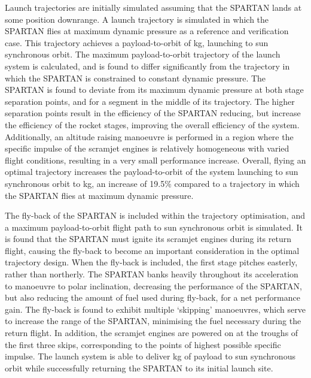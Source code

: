 Launch trajectories are initially simulated assuming that the SPARTAN lands at some position downrange. A launch trajectory is simulated in which the SPARTAN flies at maximum dynamic pressure as a reference and verification case. This trajectory achieves a payload-to-orbit of \PayloadToOrbitConstqNoReturn kg, launching to sun synchronous orbit.  
The maximum payload-to-orbit trajectory of the launch system is calculated, and is found to differ significantly from the trajectory in which the SPARTAN is constrained to constant dynamic pressure. 
 The SPARTAN is found to deviate from its maximum dynamic pressure at both stage separation points, and for a segment in the middle of its trajectory.
 The higher separation points result in the efficiency of the SPARTAN reducing, but increase the efficiency of the rocket stages, improving the overall efficiency of the system. 
  Additionally, an altitude raising manoeuvre is performed in a region where the specific impulse of the scramjet engines is relatively homogeneous with varied flight conditions, resulting in a very small performance increase. Overall, flying an optimal trajectory increases the payload-to-orbit of the system launching to sun synchronous orbit to \PayloadToOrbitStandardNoReturn kg, an increase of 19.5\% compared to a trajectory in which the SPARTAN flies at maximum dynamic pressure.  
 
 
 The fly-back of the SPARTAN is included within the trajectory optimisation, and a maximum payload-to-orbit flight path to sun synchronous orbit is simulated. 
 It is found that the SPARTAN must ignite its scramjet engines during its return flight, causing the fly-back to become an important consideration in the optimal trajectory design. When the fly-back is included, the first stage pitches easterly, rather than northerly. The SPARTAN banks heavily throughout its acceleration to manoeuvre to polar inclination, decreasing the performance of the SPARTAN, but also reducing the amount of fuel used during fly-back, for a net performance gain. 
The fly-back is found to exhibit multiple `skipping' manoeuvres, which serve to increase the range of the SPARTAN, minimising the fuel necessary during the return flight. In addition, the scramjet engines are powered on at the troughs of the first three skips, corresponding to the points of highest possible specific impulse. The launch system is able to deliver \PayloadToOrbitStandard kg of payload to sun synchronous orbit while successfully returning the SPARTAN to its initial launch site.  

